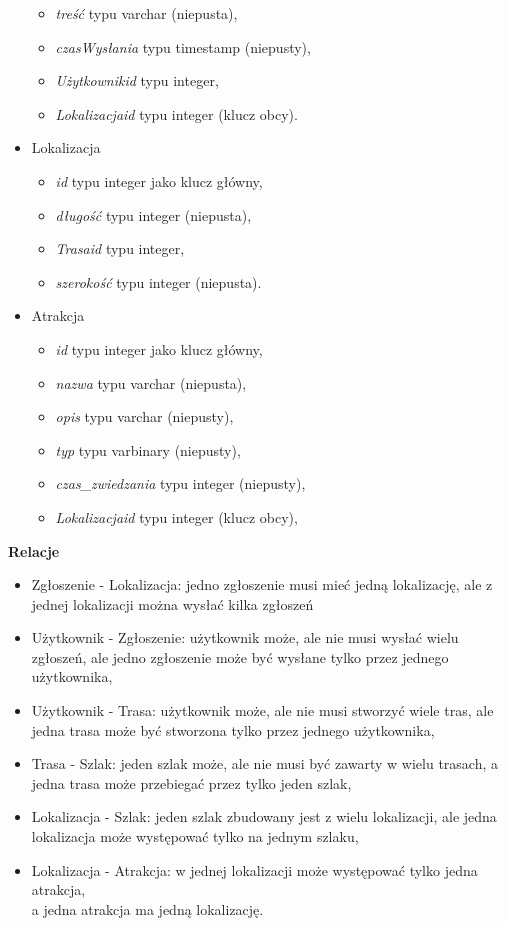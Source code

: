 \begin{itemize}
\begin{itemize}
            \item \textit{treść} typu varchar (niepusta),
            \item \textit{czasWysłania} typu timestamp (niepusty),
            \item \textit{Użytkownikid} typu integer,
            \item \textit{Lokalizacjaid} typu integer (klucz obcy).
        \end{itemize}
        \item []Lokalizacja
        \begin{itemize}
            \item \textit{id} typu integer jako klucz główny,
            \item \textit{długość} typu integer (niepusta),
            \item \textit{Trasaid} typu integer,
            \item \textit{szerokość} typu integer (niepusta).
        \end{itemize}
        \item []Atrakcja
        \begin{itemize}
            \item \textit{id} typu integer jako klucz główny,
            \item \textit{nazwa} typu varchar (niepusta),
            \item \textit{opis} typu varchar (niepusty),
            \item \textit{typ} typu varbinary (niepusty),
            \item \textit{czas\_zwiedzania} typu integer (niepusty),
            \item \textit{Lokalizacjaid} typu integer (klucz obcy),
        \end{itemize}
    \end{itemize}
    
    \noindent
    \textbf{Relacje}
    \begin{itemize}
        \item Zgłoszenie - Lokalizacja: jedno zgłoszenie musi mieć jedną lokalizację, ale z jednej lokalizacji można wysłać kilka zgłoszeń
        \item Użytkownik - Zgłoszenie: użytkownik może, ale nie musi wysłać wielu zgłoszeń, ale jedno zgłoszenie może być wysłane tylko przez jednego użytkownika,
        \item Użytkownik - Trasa: użytkownik może, ale nie musi stworzyć wiele tras, ale jedna trasa może być stworzona tylko przez jednego użytkownika,
        \item Trasa - Szlak: jeden szlak może, ale nie musi być zawarty w wielu trasach, a jedna trasa może przebiegać przez tylko jeden szlak,
        \item Lokalizacja - Szlak: jeden szlak zbudowany jest z wielu lokalizacji, ale jedna lokalizacja może występować tylko na jednym szlaku,
        \item Lokalizacja - Atrakcja: w jednej lokalizacji może występować tylko jedna atrakcja, \\a jedna atrakcja ma jedną lokalizację.
    \end{itemize}

